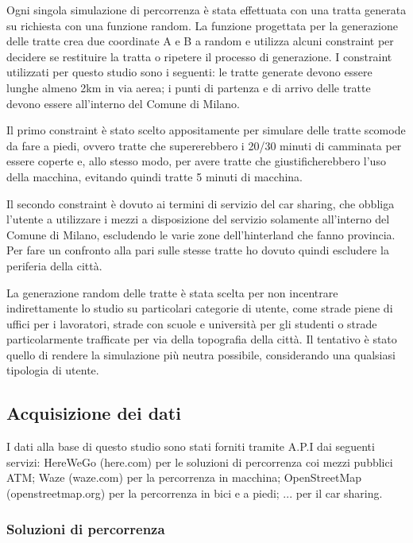 Ogni singola simulazione di percorrenza è stata effettuata con una tratta generata su richiesta con una funzione random. La funzione progettata per la generazione delle tratte crea due coordinate A e B a random e utilizza alcuni constraint per decidere se restituire la tratta o ripetere il processo di generazione. I constraint utilizzati per questo studio sono i seguenti: le tratte generate devono essere lunghe almeno 2km in via aerea; i punti di partenza e di arrivo delle tratte devono essere all'interno del Comune di Milano.

Il primo constraint è stato scelto appositamente per simulare delle tratte scomode da fare a piedi, ovvero tratte che supererebbero i 20/30 minuti di camminata per essere coperte e, allo stesso modo, per avere tratte che giustificherebbero l'uso della macchina, evitando quindi tratte 5 minuti di macchina.

Il secondo constraint è dovuto ai termini di servizio del car sharing, che obbliga l'utente a utilizzare i mezzi a disposizione del servizio solamente all'interno del Comune di Milano, escludendo le varie zone dell'hinterland che fanno provincia. Per fare un confronto alla pari sulle stesse tratte ho dovuto quindi escludere la periferia della città.

La generazione random delle tratte è stata scelta per non incentrare indirettamente lo studio su particolari categorie di utente, come strade piene di uffici per i lavoratori, strade con scuole e università per gli studenti o strade particolarmente trafficate per via della topografia della città. Il tentativo è stato quello di rendere la simulazione più neutra possibile, considerando una qualsiasi tipologia di utente.

\subsection{Acquisizione dei dati}

I dati alla base di questo studio sono stati forniti tramite A.P.I dai seguenti servizi: HereWeGo (here.com) per le soluzioni di percorrenza coi mezzi pubblici ATM; Waze (waze.com) per la percorrenza in macchina; OpenStreetMap (openstreetmap.org) per la percorrenza in bici e a piedi; ... per il car sharing.

\subsubsection{Soluzioni di percorrenza}

